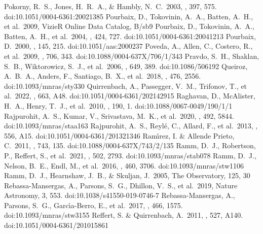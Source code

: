 \documentclass[twocolumn,tighten,twocolappendix]{aastex631}
\begin{document}
\begin{thebibliography}{}
 Pokorny, R.~S., Jones, H.~R.~A., \& Hambly, N.~C.\ 2003, \aap, 397, 575. doi:10.1051/0004-6361:20021385
 Pourbaix, D., Tokovinin, A.~A., Batten, A.~H., et al.\ 2009, VizieR Online Data Catalog, B/sb9
 Pourbaix, D., Tokovinin, A.~A., Batten, A.~H., et al.\ 2004, \aap, 424, 727. doi:10.1051/0004-6361:20041213
 Pourbaix, D.\ 2000, \aaps, 145, 215. doi:10.1051/aas:2000237
 Poveda, A., Allen, C., Costero, R., et al.\ 2009, \apj, 706, 343. doi:10.1088/0004-637X/706/1/343
 Pravdo, S.~H., Shaklan, S.~B., Wiktorowicz, S.~J., et al.\ 2006, \apj, 649, 389. doi:10.1086/506192
 Queiroz, A.~B.~A., Anders, F., Santiago, B.~X., et al.\ 2018, \mnras, 476, 2556. doi:10.1093/mnras/sty330
 Quirrenbach, A., Passegger, V.~M., Trifonov, T., et al.\ 2022, \aap, 663, A48. doi:10.1051/0004-6361/202142915
 Raghavan, D., McAlister, H.~A., Henry, T.~J., et al.\ 2010, \apjs, 190, 1. doi:10.1088/0067-0049/190/1/1
 Rajpurohit, A.~S., Kumar, V., Srivastava, M.~K., et al.\ 2020, \mnras, 492, 5844. doi:10.1093/mnras/staa163
 Rajpurohit, A.~S., Reyl{\'e}, C., Allard, F., et al.\ 2013, \aap, 556, A15. doi:10.1051/0004-6361/201321346
 Ram{\'\i}rez, I. \& Allende Prieto, C.\ 2011, \apj, 743, 135. doi:10.1088/0004-637X/743/2/135
 Ramm, D.~J., Robertson, P., Reffert, S., et al.\ 2021, \mnras, 502, 2793. doi:10.1093/mnras/stab078
 Ramm, D.~J., Nelson, B.~E., Endl, M., et al.\ 2016, \mnras, 460, 3706. doi:10.1093/mnras/stw1106
 Ramm, D.~J., Hearnshaw, J.~B., \& Skuljan, J.\ 2005, The Observatory, 125, 30
 Rebassa-Mansergas, A., Parsons, S.~G., Dhillon, V.~S., et al.\ 2019, Nature Astronomy, 3, 553. doi:10.1038/s41550-019-0746-7
 Rebassa-Mansergas, A., Parsons, S.~G., Garc{\'\i}a-Berro, E., et al.\ 2017, \mnras, 466, 1575. doi:10.1093/mnras/stw3155
 Reffert, S. \& Quirrenbach, A.\ 2011, \aap, 527, A140. doi:10.1051/0004-6361/201015861

\end{thebibliography}
\end{document}
